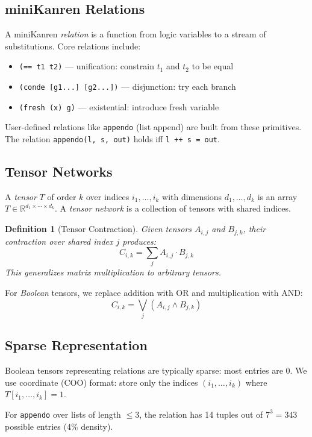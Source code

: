 \documentclass[11pt,a4paper]{article}
\newtheorem{definition}[theorem]{Definition}
\begin{document}
\subsection{miniKanren Relations}

A miniKanren \emph{relation} is a function from logic variables to a stream of substitutions.
Core relations include:
\begin{itemize}
  \item \texttt{(== t1 t2)} --- unification: constrain $t_1$ and $t_2$ to be equal
  \item \texttt{(conde [g1...] [g2...])} --- disjunction: try each branch
  \item \texttt{(fresh (x) g)} --- existential: introduce fresh variable
\end{itemize}

User-defined relations like \texttt{appendo} (list append) are built from these primitives.
The relation \texttt{appendo(l, s, out)} holds iff \texttt{l ++ s = out}.

\subsection{Tensor Networks}

A \emph{tensor} $T$ of order $k$ over indices $i_1, \ldots, i_k$ with dimensions $d_1, \ldots, d_k$
is an array $T \in \mathbb{R}^{d_1 \times \cdots \times d_k}$.
A \emph{tensor network} is a collection of tensors with shared indices.

\begin{definition}[Tensor Contraction]
Given tensors $A_{i,j}$ and $B_{j,k}$, their contraction over shared index $j$ produces:
\[
C_{i,k} = \sum_j A_{i,j} \cdot B_{j,k}
\]
This generalizes matrix multiplication to arbitrary tensors.
\end{definition}

For \emph{Boolean} tensors, we replace addition with OR and multiplication with AND:
\[
C_{i,k} = \bigvee_j (A_{i,j} \land B_{j,k})
\]

\subsection{Sparse Representation}

Boolean tensors representing relations are typically sparse: most entries are 0.
We use coordinate (COO) format: store only the indices $(i_1, \ldots, i_k)$ where $T[i_1, \ldots, i_k] = 1$.

For \texttt{appendo} over lists of length $\leq 3$, the relation has 14 tuples out of $7^3 = 343$ possible entries (4\% density).
\end{document}
